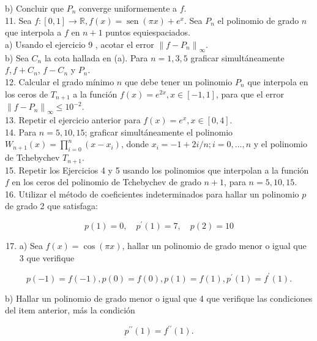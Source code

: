 \documentclass[10pt]{book}
\begin{document}
b) Concluir que $P_{n}$ converge uniformemente a $f$.\\
11. Sea $f:[0,1] \rightarrow \mathbb{R}, f(x)=\operatorname{sen}(\pi x)+e^{x}$. Sea $P_{n}$ el polinomio de grado $n$ que interpola a $f$ en $n+1$ puntos equiespaciados.\\
a) Usando el ejercicio 9 , acotar el error $\left\|f-P_{n}\right\|_{\infty}$.\\
b) Sea $C_{n}$ la cota hallada en (a). Para $n=1,3,5$ graficar simultáneamente $f, f+C_{n}$, $f-C_{n}$ y $P_{n}$.\\
12. Calcular el grado mínimo $n$ que debe tener un polinomio $P_{n}$ que interpola en los ceros de $T_{n+1}$ a la función $f(x)=e^{2 x}, x \in[-1,1]$, para que el error $\left\|f-P_{n}\right\|_{\infty} \leq 10^{-2}$.\\
13. Repetir el ejercicio anterior para $f(x)=e^{x}, x \in[0,4]$.\\
14. Para $n=5,10,15$; graficar simultáneamente el polinomio $W_{n+1}(x)=\prod_{i=0}^{n}\left(x-x_{i}\right)$, donde $x_{i}=-1+2 i / n ; i=0, \ldots, n$ y el polinomio de Tchebychev $T_{n+1}$.\\
15. Repetir los Ejercicios 4 y 5 usando los polinomios que interpolan a la función $f$ en los ceros del polinomio de Tchebychev de grado $n+1$, para $n=5,10,15$.\\
16. Utilizar el método de coeficientes indeterminados para hallar un polinomio $p$ de grado 2 que satisfaga:

$$
p(1)=0, \quad p^{\prime}(1)=7, \quad p(2)=10
$$

\begin{enumerate}
  \setcounter{enumi}{16}
  \item a) Sea $f(x)=\cos (\pi x)$, hallar un polinomio de grado menor o igual que 3 que verifique
\end{enumerate}

$$
p(-1)=f(-1), p(0)=f(0), p(1)=f(1), p^{\prime}(1)=f^{\prime}(1) .
$$

b) Hallar un polinomio de grado menor o igual que 4 que verifique las condiciones del item anterior, más la condición

$$
p^{\prime \prime}(1)=f^{\prime \prime}(1) .
$$
\end{document}
